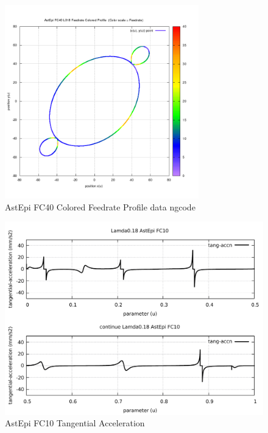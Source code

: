 \begin{figure}
	\caption     {AstEpi FC40 Colored Feedrate Profile data ngcode}
	\label{20-img-AstEpi-FC40-Colored-Feedrate-Profile-data_ngcode.png}
\includegraphics[width=0.75\textwidth]{Chap4/appendix/app-AstEpi/plots/20-img-AstEpi-FC40-Colored-Feedrate-Profile-data_ngcode.png}
\end{figure}

\clearpage
\pagebreak

\begin{figure}
	\caption     {AstEpi FC10 Tangential Acceleration}
	\label{21-img-AstEpi-FC10-Tangential-Acceleration.pdf}
\includegraphics[width=1.00\textwidth]{Chap4/appendix/app-AstEpi/plots/21-img-AstEpi-FC10-Tangential-Acceleration.pdf}
\end{figure}


